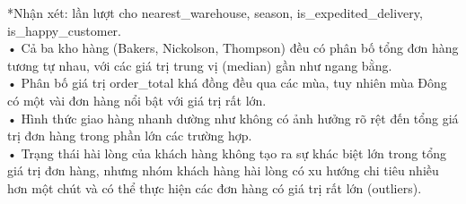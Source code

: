 *Nhận xét: lần lượt cho  nearest\_warehouse, season, is\_expedited\_delivery, is\_happy\_customer.\\
•	Cả ba kho hàng (Bakers, Nickolson, Thompson) đều có phân bố tổng đơn hàng tương tự nhau, với các giá trị trung vị (median) gần như ngang bằng.\\
•	Phân bố giá trị order\_total khá đồng đều qua các mùa, tuy nhiên mùa Đông có một vài đơn hàng nổi bật với giá trị rất lớn.\\
•	Hình thức giao hàng nhanh dường như không có ảnh hưởng rõ rệt đến tổng giá trị đơn hàng trong phần lớn các trường hợp.\\
•	Trạng thái hài lòng của khách hàng không tạo ra sự khác biệt lớn trong tổng giá trị đơn hàng, nhưng nhóm khách hàng hài lòng có xu hướng chi tiêu nhiều hơn một chút và có thể thực hiện các đơn hàng có giá trị rất lớn (outliers).
